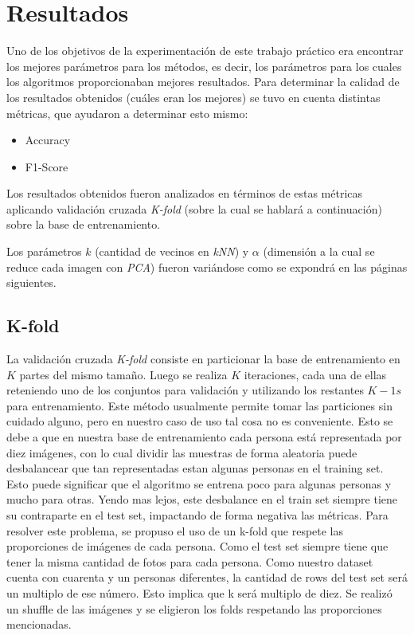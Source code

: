 \section{Resultados}

Uno de los objetivos de la experimentación de este trabajo práctico era encontrar los mejores parámetros para los métodos, es decir, los parámetros para los cuales los algoritmos proporcionaban mejores resultados. Para determinar la calidad de los resultados obtenidos (cuáles eran los mejores) se tuvo en cuenta distintas métricas, que ayudaron a determinar esto mismo:

\begin{itemize}
\item Accuracy
\item F1-Score
\end{itemize}

Los resultados obtenidos fueron analizados en términos de estas métricas aplicando validación cruzada \textit{K-fold} (sobre la cual se hablará a continuación) sobre la base de entrenamiento.

Los parámetros $k$ (cantidad de vecinos en \textit{kNN}) y $\alpha$ (dimensión a la cual se reduce cada imagen con \textit{PCA}) fueron variándose como se expondrá en las páginas siguientes.

\subsection{K-fold}

La validación cruzada \textit{K-fold} consiste en particionar la base de entrenamiento en $K$ partes del mismo tamaño. Luego se realiza $K$ iteraciones, cada una de ellas reteniendo uno de los conjuntos para validación y utilizando los restantes $K - 1s$ para entrenamiento. Este método usualmente permite tomar las particiones sin cuidado alguno, pero en nuestro caso de uso tal cosa no es conveniente. Esto se debe a que en nuestra base de entrenamiento cada persona está representada por diez imágenes, con lo cual dividir las muestras de forma aleatoria puede desbalancear que tan representadas estan algunas personas en el training set. Esto puede significar que el algoritmo se entrena poco para algunas personas y mucho para otras. Yendo mas lejos, este desbalance en el train set siempre tiene su contraparte en el test set, impactando de forma negativa las métricas.
Para resolver este problema, se propuso el uso de un k-fold que respete las proporciones de imágenes de cada persona. Como el test set siempre tiene que tener la misma cantidad de fotos para cada persona. Como nuestro dataset cuenta con cuarenta y un personas diferentes, la cantidad de rows del test set será un multiplo de ese número. Esto implica que k será multiplo de diez. Se realizó un shuffle de las imágenes y se eligieron los folds respetando las proporciones mencionadas.


